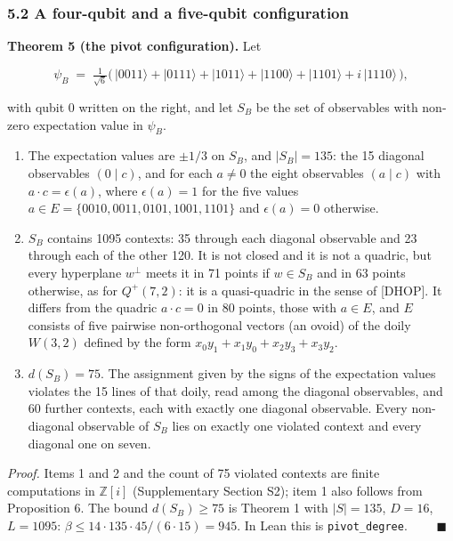 \documentclass[11pt,a4paper]{article}
\providecommand{\tightlist}{\setlength{\itemsep}{0pt}\setlength{\parskip}{0pt}}
\begin{document}
\subsubsection{5.2 A four-qubit and a five-qubit configuration}\label{52-a-four-qubit-and-a-five-qubit-configuration}

\textbf{Theorem 5 (the pivot configuration).} Let

\[\psi_B \;=\; \tfrac{1}{\sqrt6}\big(\,|0011\rangle + |0111\rangle + |1011\rangle + |1100\rangle + |1101\rangle + i\,|1110\rangle\,\big),\]

with qubit 0 written on the right, and let \(S_B\) be the set of observables with non-zero expectation
value in \(\psi_B\).

\begin{enumerate}
\def\labelenumi{\arabic{enumi}.}
\tightlist
\item
  The expectation values are \(\pm 1/3\) on \(S_B\), and \(|S_B| = 135\): the 15 diagonal observables
  \((0 \mid c)\), and for each \(a \ne 0\) the eight observables \((a \mid c)\) with \(a \cdot c = \epsilon(a)\), where
  \(\epsilon(a) = 1\) for the five values \(a \in E = \{0010, 0011, 0101, 1001, 1101\}\) and \(\epsilon(a) = 0\)
  otherwise.
\item
  \(S_B\) contains 1095 contexts: 35 through each diagonal observable and 23 through each of the other
  120. It is not closed and it is not a quadric, but every hyperplane \(w^\perp\) meets it in 71 points if
  \(w \in S_B\) and in 63 points otherwise, as for \(Q^+(7,2)\): it is a quasi-quadric in the sense of
  {[}DHOP{]}. It differs from the quadric \(a \cdot c = 0\) in 80 points, those with \(a \in E\), and \(E\)
  consists of five pairwise non-orthogonal vectors (an ovoid) of the doily \(W(3,2)\) defined by the form
  \(x_0y_1 + x_1y_0 + x_2y_3 + x_3y_2\).
\item
  \(d(S_B) = 75\). The assignment given by the signs of the expectation values violates the 15 lines of
  that doily, read among the diagonal observables, and 60 further contexts, each with exactly one
  diagonal observable. Every non-diagonal observable of \(S_B\) lies on exactly one violated context and
  every diagonal one on seven.
\end{enumerate}

\emph{Proof.} Items 1 and 2 and the count of 75 violated contexts are finite computations in \(\mathbb{Z}[i]\)
(Supplementary Section S2); item 1 also follows from Proposition 6. The bound \(d(S_B) \ge 75\) is Theorem 1 with
\(|S| = 135\), \(D = 16\), \(L = 1095\): \(\beta \le 14 \cdot 135 \cdot 45 / (6 \cdot 15) = 945\). In Lean this
is \texttt{pivot\_degree}. \(\qquad\blacksquare\)
\end{document}

